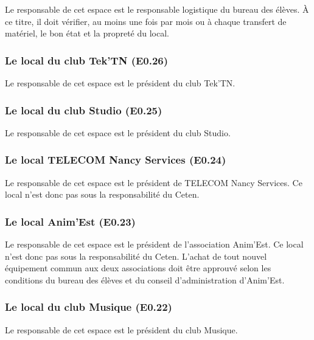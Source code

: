 \documentclass{article} %
\begin{document}
				Le responsable de cet espace est le responsable logistique du
				bureau des élèves. À ce titre, il doit vérifier, au moins une
				fois par mois ou à chaque transfert de matériel, le bon état et
				la propreté du local.

			\subsubsection{Le local du club Tek'TN (E0.26)}
\label{ssub:le_local_du_club_tek_tn_e0_26_}

				Le responsable de cet espace est le président du club Tek’TN\@.

			\subsubsection{Le local du club Studio (E0.25)}
\label{ssub:le_local_du_club_studio_e0_25_}

				Le responsable de cet espace est le président du club Studio. 

			\subsubsection{Le local TELECOM Nancy Services (E0.24)}
\label{ssub:le_local_telecom_nancy_services_e0_24_}

				Le responsable de cet espace est le président de TELECOM Nancy
				Services. Ce local n’est donc pas sous la responsabilité du
				Ceten.

			\subsubsection{Le local Anim'Est (E0.23)}
\label{ssub:le_local_anim_est_e0_23_}

				Le responsable de cet espace est le président de l’association
				Anim’Est. Ce local n’est donc pas sous la responsabilité du
				Ceten. L’achat de tout nouvel équipement commun aux deux
				associations doit être approuvé selon les conditions du bureau
				des élèves et du conseil d'administration d’Anim’Est.

			\subsubsection{Le local du club Musique (E0.22)}
\label{ssub:le_local_du_club_musique_e0_22_}

				Le responsable de cet espace est le président du club Musique.
\end{document}
